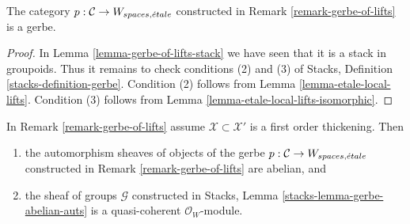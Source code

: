 \begin{lemma}
\label{lemma-gerbe-of-lifts}
The category $p : \mathcal{C} \to W_{spaces, {\acute{e}tale}}$ constructed
in Remark \ref{remark-gerbe-of-lifts} is a gerbe.
\end{lemma}

\begin{proof}
In Lemma \ref{lemma-gerbe-of-lifts-stack}
we have seen that it is a stack in groupoids.
Thus it remains to check conditions (2) and (3) of
Stacks, Definition \ref{stacks-definition-gerbe}.
Condition (2) follows from
Lemma \ref{lemma-etale-local-lifts}.
Condition (3) follows from
Lemma \ref{lemma-etale-local-lifts-isomorphic}.
\end{proof}

\begin{lemma}
\label{lemma-gerbe-of-lifts-first-order}
In Remark \ref{remark-gerbe-of-lifts} assume $\mathcal{X} \subset \mathcal{X}'$
is a first order thickening. Then
\begin{enumerate}
\item the automorphism sheaves of objects of the gerbe
$p : \mathcal{C} \to W_{spaces, {\acute{e}tale}}$ constructed
in Remark \ref{remark-gerbe-of-lifts} are abelian, and
\item the sheaf of groups $\mathcal{G}$ constructed in
Stacks, Lemma \ref{stacks-lemma-gerbe-abelian-auts}
is a quasi-coherent $\mathcal{O}_W$-module.
\end{enumerate}
\end{lemma}

